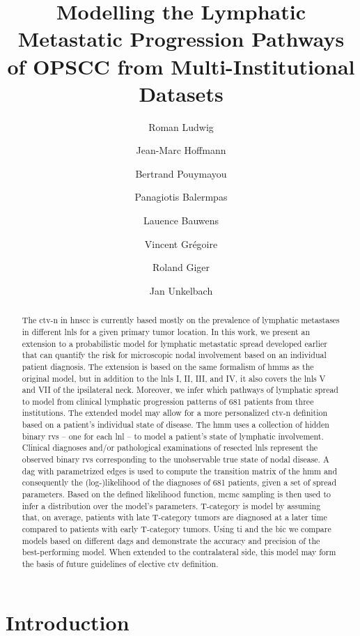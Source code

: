 \documentclass[twocolumn]{aastex631}
\begin{document}
\title{Modelling the Lymphatic Metastatic Progression Pathways of OPSCC from Multi-Institutional Datasets}

\author{Roman Ludwig}
\author{Jean-Marc Hoffmann}
\author{Bertrand Pouymayou}
\author{Panagiotis Balermpas}
\author{Lauence Bauwens}
\author{Vincent Grégoire}
\author{Roland Giger}
\author{Jan Unkelbach}

\begin{abstract}
    The \gls{ctv-n} in \gls{hnscc} is currently based mostly on the prevalence of lymphatic metastases in different \glspl{lnl} for a given primary tumor location. In this work, we present an extension to a probabilistic model for lymphatic metastatic spread developed earlier that can quantify the risk for microscopic nodal involvement based on an individual patient diagnosis. The extension is based on the same formalism of \glspl{hmm} as the original model, but in addition to the \glspl{lnl} I, II, III, and IV, it also covers the \glspl{lnl} V and VII of the ipsilateral neck. Moreover, we infer which pathways of lymphatic spread to model from clinical lymphatic progression patterns of 681 patients from three institutions. The extended model may allow for a more personalized \gls{ctv-n} definition based on a patient's individual state of disease. The \gls{hmm} uses a collection of hidden binary \glspl{rv} -- one for each \gls{lnl} -- to model a patient's state of lymphatic involvement. Clinical diagnoses and/or pathological examinations of resected \glspl{lnl} represent the observed binary \glspl{rv} corresponding to the unobservable true state of nodal disease. A \gls{dag} with parametrized edges is used to compute the transition matrix of the \gls{hmm} and consequently the (log-)likelihood of the diagnoses of 681 patients, given a set of spread parameters. Based on the defined likelihood function, \gls{mcmc} sampling is then used to infer a distribution over the model's parameters. T-category is model by assuming that, on average, patients with late T-category tumors are diagnosed at a later time compared to patients with early T-category tumors. Using \gls{ti} and the \gls{bic} we compare models based on different \glspl{dag} and demonstrate the accuracy and precision of the best-performing model. When extended to the contralateral side, this model may form the basis of future guidelines of elective \gls{ctv} definition.
\end{abstract}


\section{Introduction}
\label{sec:intro}
\end{document}
